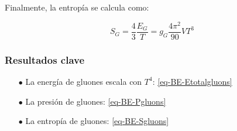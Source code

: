 






Finalmente, la entropía se calcula como:

\begin{equation}\label{eq-BE-Sgluons}
S_G = \frac{4}{3} \frac{E_G}{T} = g_G \frac{4\pi^2}{90} V T^3
\end{equation}

\subsubsection{Resultados clave}
\begin{itemize}
\item[$\bullet$] La energía de gluones escala con $T^4$: \eqref{eq-BE-Etotalgluons}
\item[$\bullet$] La presión de gluones: \eqref{eq-BE-Pgluons}
\item[$\bullet$] La entropía de gluones: \eqref{eq-BE-Sgluons}
\end{itemize}

